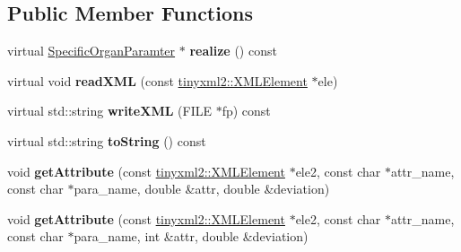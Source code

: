 \subsection*{Public Member Functions}
\begin{DoxyCompactItemize}
\item 
\mbox{\label{classCPlantBox_1_1OrganRandomOrganParameter_a62915589b7b8e08c70c77c6402b026d1}} 
virtual \hyperlink{classCPlantBox_1_1SpecificOrganParamter}{Specific\+Organ\+Paramter} $\ast$ {\bfseries realize} () const
\item 
\mbox{\label{classCPlantBox_1_1OrganRandomOrganParameter_a564a3f0e973eb82b55ff0cef392eb077}} 
virtual void {\bfseries read\+X\+ML} (const \hyperlink{classCPlantBox_1_1tinyxml2_1_1XMLElement}{tinyxml2\+::\+X\+M\+L\+Element} $\ast$ele)
\item 
\mbox{\label{classCPlantBox_1_1OrganRandomOrganParameter_aaab3491ac35f75fa9a25bf05104e0b0f}} 
virtual std\+::string {\bfseries write\+X\+ML} (F\+I\+LE $\ast$fp) const
\item 
\mbox{\label{classCPlantBox_1_1OrganRandomOrganParameter_adbf24f95c8bbd94714c1000697ec4001}} 
virtual std\+::string {\bfseries to\+String} () const
\item 
\mbox{\label{classCPlantBox_1_1OrganRandomOrganParameter_a4eba421bf3955954392260ff256da5a0}} 
void {\bfseries get\+Attribute} (const \hyperlink{classCPlantBox_1_1tinyxml2_1_1XMLElement}{tinyxml2\+::\+X\+M\+L\+Element} $\ast$ele2, const char $\ast$attr\+\_\+name, const char $\ast$para\+\_\+name, double \&attr, double \&deviation)
\item 
\mbox{\label{classCPlantBox_1_1OrganRandomOrganParameter_aabc58cf8d0d3e3c03b29246b83588d1f}} 
void {\bfseries get\+Attribute} (const \hyperlink{classCPlantBox_1_1tinyxml2_1_1XMLElement}{tinyxml2\+::\+X\+M\+L\+Element} $\ast$ele2, const char $\ast$attr\+\_\+name, const char $\ast$para\+\_\+name, int \&attr, double \&deviation)
\item 
\mbox{\label{classCPlantBox_1_1OrganRandomOrganParameter_a728a2f0248a1033ca741dfd7905771b9}} 

\end{DoxyCompactItemize}
